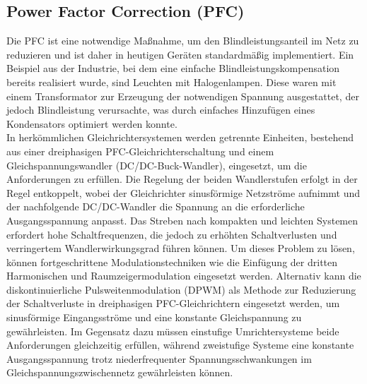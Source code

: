 		
		\subsection{Power Factor Correction (PFC)}
		Die \gls{PFC} ist eine notwendige Maßnahme, um den Blindleistungsanteil im Netz zu reduzieren und ist daher in heutigen Geräten standardmäßig implementiert. Ein Beispiel aus der Industrie, bei dem eine einfache Blindleistungskompensation bereits realisiert wurde, sind Leuchten mit Halogenlampen. Diese waren mit einem Transformator zur Erzeugung der notwendigen Spannung ausgestattet, der jedoch Blindleistung verursachte, was durch einfaches Hinzufügen eines Kondensators optimiert werden konnte. \\
		In herkömmlichen Gleichrichtersystemen werden getrennte Einheiten, bestehend aus einer dreiphasigen PFC-Gleichrichterschaltung und einem Gleichspannungswandler (DC/DC-Buck-Wandler), eingesetzt, um die Anforderungen zu erfüllen. Die Regelung der beiden Wandlerstufen erfolgt in der Regel entkoppelt, wobei der Gleichrichter sinusförmige Netzströme aufnimmt und der nachfolgende DC/DC-Wandler die Spannung an die erforderliche Ausgangsspannung anpasst. Das Streben nach kompakten und leichten Systemen erfordert hohe Schaltfrequenzen, die jedoch zu erhöhten Schaltverlusten und verringertem Wandlerwirkungsgrad führen können. Um dieses Problem zu lösen, können fortgeschrittene Modulationstechniken wie die Einfügung der dritten Harmonischen und Raumzeigermodulation eingesetzt werden. Alternativ kann die diskontinuierliche Pulsweitenmodulation (DPWM) als Methode zur Reduzierung der Schaltverluste in dreiphasigen PFC-Gleichrichtern eingesetzt werden, um sinusförmige Eingangsströme und eine konstante Gleichspannung zu gewährleisten. Im Gegensatz dazu müssen einstufige Umrichtersysteme beide Anforderungen gleichzeitig erfüllen, während zweistufige Systeme eine konstante Ausgangsspannung trotz niederfrequenter Spannungsschwankungen im Gleichspannungszwischennetz gewährleisten können.			
